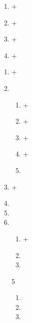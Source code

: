 
\begin{enumerate}
  \item +    
  \item +  
  \item +  
  \item +
\end{enumerate}


\begin{enumerate}
  \item +
  
  \item
  
	  \begin{enumerate}
	  \item +	  
	  \item +	  
	  \item +	  
	  \item +
	  
	  \item

	  \end{enumerate}
  
  \item +
  
  \item
  
  \item
  
  \item
  
    \begin{enumerate}
    \item +
    
    \item
    
    \item
    \end{enumerate}
\end{enumerate}

\begin{enumerate}
  \item[5]
	  \begin{enumerate}
	  \item
	  
	  \item
	  
	  \item
	  \end{enumerate}
\end{enumerate}

